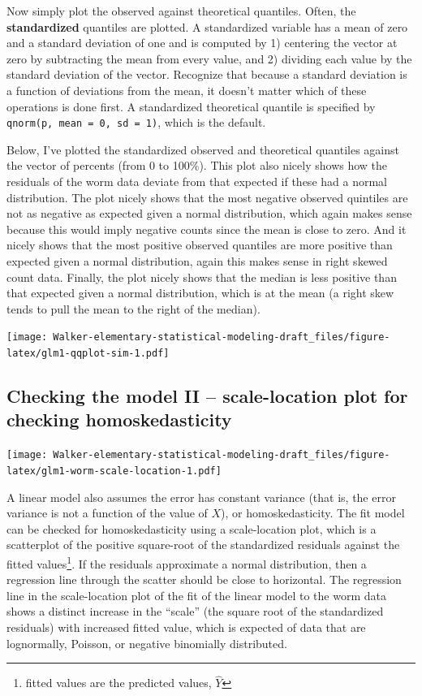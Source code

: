 \documentclass[]{book}
\let\rmarkdownfootnote\footnote%
\def\footnote{\protect\rmarkdownfootnote}
\begin{document}
Now simply plot the observed against theoretical quantiles. Often, the \textbf{standardized} quantiles are plotted. A standardized variable has a mean of zero and a standard deviation of one and is computed by 1) centering the vector at zero by subtracting the mean from every value, and 2) dividing each value by the standard deviation of the vector. Recognize that because a standard deviation is a function of deviations from the mean, it doesn't matter which of these operations is done first. A standardized theoretical quantile is specified by \texttt{qnorm(p,\ mean\ =\ 0,\ sd\ =\ 1)}, which is the default.

Below, I've plotted the standardized observed and theoretical quantiles against the vector of percents (from 0 to 100\%). This plot also nicely shows how the residuals of the worm data deviate from that expected if these had a normal distribution. The plot nicely shows that the most negative observed quintiles are not as negative as expected given a normal distribution, which again makes sense because this would imply negative counts since the mean is close to zero. And it nicely shows that the most positive observed quantiles are more positive than expected given a normal distribution, again this makes sense in right skewed count data. Finally, the plot nicely shows that the median is less positive than that expected given a normal distribution, which is at the mean (a right skew tends to pull the mean to the right of the median).

\texttt{[image: Walker-elementary-statistical-modeling-draft\_files/figure-latex/glm1-qqplot-sim-1.pdf]}

\hypertarget{checking-the-model-ii-scale-location-plot-for-checking-homoskedasticity}{%
\subsection{Checking the model II -- scale-location plot for checking homoskedasticity}\label{checking-the-model-ii-scale-location-plot-for-checking-homoskedasticity}}

\texttt{[image: Walker-elementary-statistical-modeling-draft\_files/figure-latex/glm1-worm-scale-location-1.pdf]}

A linear model also assumes the error has constant variance (that is, the error variance is not a function of the value of \(X\)), or homoskedasticity. The fit model can be checked for homoskedasticity using a scale-location plot, which is a scatterplot of the positive square-root of the standardized residuals against the fitted values\footnote{fitted values are the predicted values, \(\hat{Y}\)}. If the residuals approximate a normal distribution, then a regression line through the scatter should be close to horizontal. The regression line in the scale-location plot of the fit of the linear model to the worm data shows a distinct increase in the ``scale'' (the square root of the standardized residuals) with increased fitted value, which is expected of data that are lognormally, Poisson, or negative binomially distributed.
\end{document}
